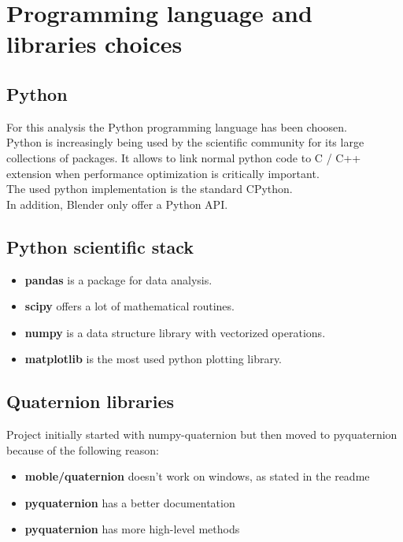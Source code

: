 \chapter{Programming language and libraries choices}
\label{chap:programming_language_libraries_choices}

\section{Python}
For this analysis the Python programming language \cite{python-website} has been choosen. \\
Python is increasingly being used by the scientific community for its large collections of packages. It allows to link normal python code to C / C++ extension when performance optimization is critically important. \\
The used python implementation is the standard CPython. \\
In addition, Blender only offer a Python API.

\section{Python scientific stack}
\begin{itemize}
	\item \textbf{pandas} is a package for data analysis.
	\item \textbf{scipy} offers a lot of mathematical routines.
	\item \textbf{numpy} is a data structure library with vectorized operations.
	\item \textbf{matplotlib} is the most used python plotting library.
\end{itemize}

\section{Quaternion libraries}

Project initially started with numpy-quaternion \cite{numpy-quaternion} but then moved to pyquaternion \cite{pyquaternion} because of the following reason:
\begin{itemize}
\item \textbf{moble/quaternion} doesn't work on windows, as stated in the readme
\item \textbf{pyquaternion} has a better documentation
\item \textbf{pyquaternion} has more high-level methods
\end{itemize}

